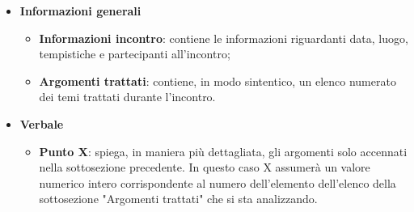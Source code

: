                \begin{itemize}
                    \item \textbf{Informazioni generali}
                    \begin{itemize}
                        \item \textbf{Informazioni incontro}: contiene le informazioni riguardanti data, luogo, tempistiche e partecipanti all'incontro;
                        \item \textbf{Argomenti trattati}: contiene, in modo sintentico, un elenco numerato dei temi trattati durante l'incontro.
                    \end{itemize}
                    \item \textbf{Verbale}
                    \begin{itemize}
                        \item \textbf{Punto X}: spiega, in maniera più dettagliata, gli argomenti solo accennati nella sottosezione precedente. In questo caso X assumerà un valore numerico intero corrispondente al numero dell'elemento dell'elenco della sottosezione "Argomenti trattati" che si sta analizzando.
                    \end{itemize}
                \end{itemize}
